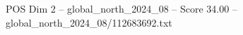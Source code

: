 \begin{textsample}{POS Dim 2 – global\_north\_2024\_08 – Score 34.00 – global\_north\_2024\_08/112683692.txt}
\end{textsample}
